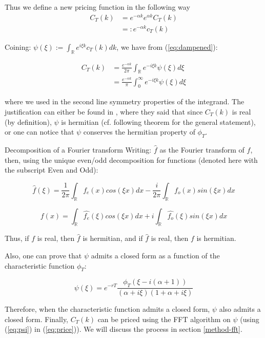 Thus we define a new pricing function in the following way
\begin{align} \label{eq:dampened}
C_T(k) &= e^{- \alpha k} e^{ \alpha k } C_T(k) \nonumber \\ 
&=: e^{- \alpha k} c_T(k)
\end{align}

Coining: $ \psi(\xi) := \int_{\mathbb  R} e^{i \xi k } c_T(k) dk  $, we have from (\ref{eq:dampened}): 

\begin{align} \label{eq:price}
C_T(k) &= \frac{ e^{- \alpha k }} { 2 \pi } \int_{\mathbb R} e^{-i \xi k } \psi( \xi ) d \xi \nonumber \\
&= \frac{ e^{- \alpha k }} {  \pi } \int_0^{\infty} e^{-i \xi k } \psi( \xi ) d \xi 
\end{align}

where we used in the second line symmetry properties of the integrand. The justification can either be found in \cite{CarrMadan}, where they said that since $C_T(k)$ is real (by definition), $ \psi $ is hermitian (cf. following theorem for the general statement), or one can notice that $\psi$ conserves the hermitian property of $\phi_T$. 

\begin{theoreme}{Decomposition of a Fourier transform}
Writing: $\hat{f}$ as the Fourier transform of $f$, then, using the unique even/odd decomposition for functions (denoted here with the subscript Even and Odd):

$$ 
\hat{f}(\xi) = \frac{1}{2 \pi } \int_{\mathbb R} f_e(x) cos(\xi x)  dx  - \frac{i}{2 \pi } \int_{\mathbb R} f_o(x) sin(\xi x)  dx 
$$

$$ 
f(x) =  \int_{\mathbb R} \hat{f_e}(\xi) cos(\xi x)  dx  + i \int_{\mathbb R} \hat{f_o}(\xi) sin(\xi x)  dx 
$$

Thus, if $f$ is real, then $\hat{f}$ is hermitian, and if $\hat{f}$ is real, then $f$ is hermitian.

\end{theoreme}

Also, one can prove that $\psi$ admits a closed form as a function of the characteristic function $\phi_T$:

\begin{equation} \label{eq:psi}
 \psi (\xi ) = e^{-rT} \frac{ \phi_T ( \xi - i ( \alpha + 1 ) ) }{( \alpha + i \xi )(1 + \alpha + i \xi )} 
\end{equation}

Therefore, when the characteristic function admits a closed form, $\psi$ also admits a closed form. Finally, $C_T(k)$ can be priced using the FFT algorithm on $\psi$ (using (\ref{eq:psi}) in (\ref{eq:price})). We will discuss the process in section \ref{method-fft}.

